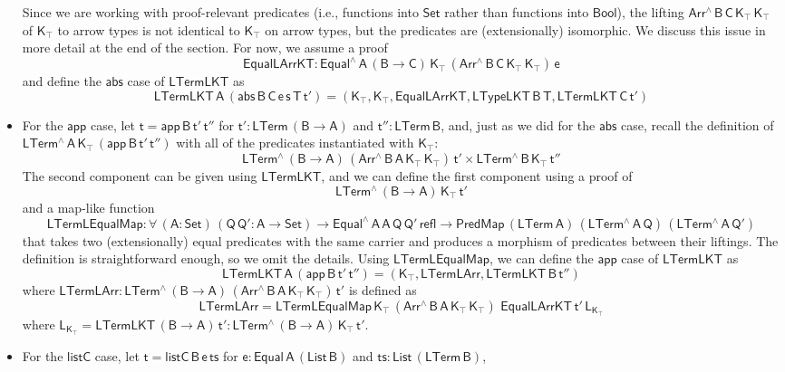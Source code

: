 \documentclass[9pt]{entcs}
\begin{document}
\begin{itemize}
\[\]
Since we are working with proof-relevant predicates
(i.e., functions into $\mathsf{Set}$ rather than functions into $\mathsf{Bool}$), 
the lifting $\mathsf{Arr^{\wedge} \, B\, C\, K_\top \, K_\top}$ of $\mathsf{K_\top}$ to arrow types
is not identical to $\mathsf{K_\top}$ on arrow types, but the predicates are (extensionally) isomorphic. 
We discuss this issue in more detail at the end of the section. 
For now, we assume a proof 
\[
  \mathsf{EqualLArrKT : Equal^{\wedge} \, A\, (B \to C)\, K_\top\, (Arr^{\wedge} \, B\, C\, K_\top \, K_\top)\, e}
\]
and define the $\mathsf{abs}$ case of $\mathsf{LTermLKT}$ as 
\[ \mathsf{LTermLKT\,A\, (abs\, B \,C \, e \,s \,T \, t') = 
    (K_\top , K_\top , EqualLArrKT , LTypeLKT\, B\, T , LTermLKT\, C\, t')
  }
\]
\item For the $\mathsf{app}$ case, let $\mathsf{t = app\, B\, t' \, t''}$
for $\mathsf{t' : LTerm\,(B \to A)}$ and $\mathsf{t'' : LTerm\,B}$,
and, just as we did for the $\mathsf{abs}$ case, 
recall the definition of $\mathsf{LTerm^{\wedge}\, A\, K_\top\, (app\, B\, t'\, t'')}$
with all of the predicates instantiated with $\mathsf{K_\top}$: 
\[
\mathsf{
      LTerm^{\wedge}\, (B \to A)\, (Arr^{\wedge} \, B\, A\, K_\top \, K_\top)\, t'
      \times LTerm^{\wedge}\, B\, K_\top\, t''}
\]
The second component can be given using $\mathsf{LTermLKT}$, and we can 
define the first component using a proof of
\[
\mathsf{LTerm^{\wedge}\, (B \to A)\, K_\top\, t'}
\]
and a map-like function 
\[
  \mathsf{LTermLEqualMap : \forall\, (A : Set)\, (Q\,Q' : A \to Set) 
    \to Equal^{\wedge}\,A\,A\,Q\,Q'\,refl
    \to PredMap\,(LTerm\,A)\, (LTerm^{\wedge}\,A\,Q)\,(LTerm^{\wedge}\,A\,Q')}
\]
that takes two (extensionally) equal predicates with the same carrier 
and produces a morphism of predicates between their liftings. The definition is 
straightforward enough, so we omit the details. 
Using $\mathsf{LTermLEqualMap}$, we can define the $\mathsf{app}$ case of $\mathsf{LTermLKT}$ as 
\[
  \mathsf{LTermLKT\,A\, (app\, B\, t'\, t'') = 
    (K_\top , LTermLArr , LTermLKT\,B\,t'')}
\]
where $\mathsf{ LTermLArr : LTerm^{\wedge}\, (B \to A)\, (Arr^{\wedge} \, B\, A\, K_\top \, K_\top)\, t'}$ is defined as
\[
  \mathsf{LTermLArr =  LTermLEqualMap\,K_\top\,(Arr^{\wedge}\,B\,A\,K_\top\,K_\top)\,\, EqualLArrKT\, t'\, L_{K_\top}}
\]
where $\mathsf{L_{K_\top} = LTermLKT\, (B \to A)\, t' : LTerm^{\wedge}\, (B \to A) \, K_\top\, t'}$.
\item For the $\mathsf{listC}$ case, let $\mathsf{t = listC\, B\, e\, ts}$
for $\mathsf{e : Equal\,A\,(List\,B)}$ and $\mathsf{ts : List\,(LTerm\, B)}$,

\end{itemize}
\end{document}
